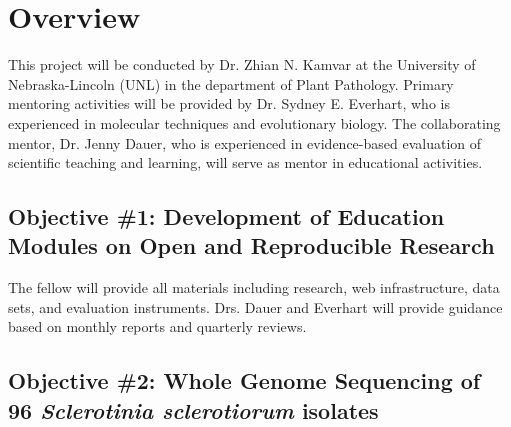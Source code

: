 \documentclass[12pt,letterpaper]{article}
\title{\ruleline{Management Plan}}
\begin{document}
\maketitle



\section{Overview}

This project will be conducted by Dr. Zhian N. Kamvar at the University of Nebraska-Lincoln (UNL) in the department of Plant Pathology. 
Primary mentoring activities will be provided by Dr. Sydney E. Everhart, who is experienced in molecular techniques and evolutionary biology. 
The collaborating mentor, Dr. Jenny Dauer, who is experienced in evidence-based evaluation of scientific teaching and learning, will serve as mentor in educational activities.


\subsection{Objective \#1: Development of Education Modules on Open and Reproducible Research}

The fellow will provide all materials including research, web infrastructure, data sets, and evaluation instruments. 
Drs. Dauer and Everhart will provide guidance based on monthly reports and quarterly reviews.

\subsection{Objective \#2: Whole Genome Sequencing of 96 \textit{Sclerotinia sclerotiorum} isolates}
\end{document}

